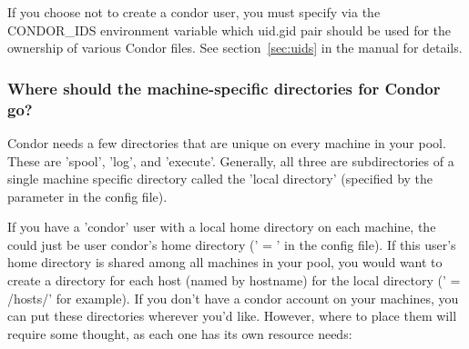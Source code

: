 If you choose not to create a condor user, you must specify via the
CONDOR\_IDS environment variable which uid.gid pair should be used for
the ownership of various Condor files.  See 
section~\ref{sec:uids} in the manual for details.

\subsubsection{ Where should the machine-specific directories for Condor go?}

Condor needs a few directories that are unique on every machine in
your pool.  These are 'spool', 'log', and 'execute'.  Generally, all
three are subdirectories of a single machine specific directory called
the 'local directory' (specified by the  parameter in the
config file).

If you have a 'condor' user with a local home directory on each
machine, the  could just be user condor's home directory
(' = ' in the config file).  If this user's home
directory is shared among all machines in your pool, you would want to
create a directory for each host (named by hostname) for the local
directory (' = /hosts/' for example).  If
you don't have a condor account on your machines, you can put these
directories wherever you'd like.  However, where to place them will
require some thought, as each one has its own resource needs:

